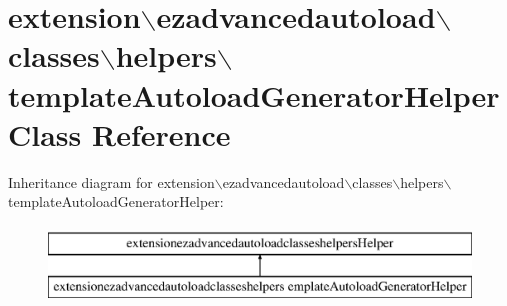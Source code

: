\hypertarget{classextension_1_1ezadvancedautoload_1_1classes_1_1helpers_1_1template_autoload_generator_helper}{\section{extension$\backslash$ezadvancedautoload$\backslash$classes$\backslash$helpers$\backslash$template\-Autoload\-Generator\-Helper \-Class \-Reference}
\label{classextension_1_1ezadvancedautoload_1_1classes_1_1helpers_1_1template_autoload_generator_helper}
}
\-Inheritance diagram for extension$\backslash$ezadvancedautoload$\backslash$classes$\backslash$helpers$\backslash$template\-Autoload\-Generator\-Helper\-:\begin{figure}[H]
\begin{center}
\leavevmode
\includegraphics[height=2.000000cm]{classextension_1_1ezadvancedautoload_1_1classes_1_1helpers_1_1template_autoload_generator_helper}
\end{center}
\end{figure}
